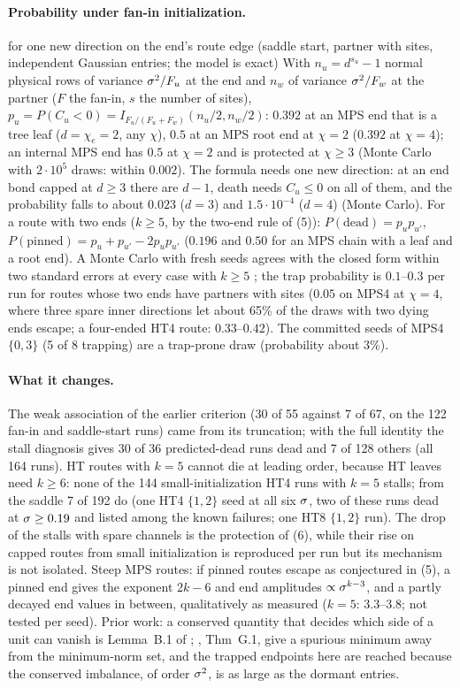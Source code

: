 \paragraph{Probability under fan-in initialization.}
\proven{} for one new direction on the end's route edge (saddle start, partner with sites, independent Gaussian
entries; the model is exact) With $n_u=d^{s_u}-1$ normal physical rows of variance $\sigma^2/F_u$ at the end and $n_w$ of
variance $\sigma^2/F_w$ at the partner ($F$ the fan-in, $s$ the number of sites), $p_u=P(C_u<0)=I_{F_u/(F_u+F_w)}(n_u/2,n_w/2)$:
$0.392$ at an MPS end that is a tree leaf ($d=\chi_e=2$, any $\chi$), $0.5$ at an MPS root end at $\chi=2$ ($0.392$ at
$\chi=4$); an internal MPS end has $0.5$ at $\chi=2$ and is protected at $\chi\ge3$ (Monte Carlo with $2\cdot10^5$ draws:
within $0.002$). The formula needs one new direction: at an end bond capped at $d\ge3$ there are $d-1$, death needs
$C_u\le0$ on all of them, and the probability falls to about $0.023$ ($d=3$) and $1.5\cdot10^{-4}$ ($d=4$) (Monte
Carlo). For a route with two ends ($k\ge5$, by the two-end rule of (5)): $P(\text{dead})=p_up_{u'}$, $P(\text{pinned})=p_u+p_{u'}-2p_up_{u'}$ ($0.196$ and $0.50$ for an
MPS chain with a leaf and a root end). A Monte Carlo with fresh seeds agrees with the closed form within two standard
errors at every case with $k\ge5$ \empirical; the trap probability is $0.1$--$0.3$ per run for routes whose two ends
have partners with sites ($0.05$ on MPS4 at $\chi=4$, where three spare inner directions let about 65\% of the draws
with two dying ends escape; a four-ended HT4 route: $0.33$--$0.42$). The committed seeds of MPS4 $\{0,3\}$ (5 of 8
trapping) are a trap-prone draw (probability about $3\%$).

\paragraph{What it changes.}
The weak association of the earlier criterion (30 of 55 against 7 of 67, on the 122 fan-in and saddle-start runs)
came from its truncation; with the full identity the stall diagnosis gives 30 of 36 predicted-dead runs dead and 7 of
128 others (all 164 runs). HT routes with $k=5$ cannot die at leading order, because HT leaves need $k\ge6$: none of
the 144 small-initialization HT4 runs with $k=5$ stalls; from the saddle 7 of 192 do (one HT4 $\{1,2\}$ seed at all six
$\sigma$, two of these runs dead at $\sigma\ge0.19$ and listed among the known failures; one HT8 $\{1,2\}$ run). The drop of the stalls with spare channels is the protection of (6),
while their rise on capped routes from small initialization is reproduced per run but its mechanism is not isolated.
Steep MPS routes: if pinned routes escape as conjectured in (5), a pinned end gives the exponent $2k-6$ and end
amplitudes $\propto\sigma^{k-3}$, and a partly decayed end values in between, qualitatively as measured ($k=5$: $3.3$--$3.8$;
not tested per seed). Prior work: a conserved quantity that decides which side of a unit can vanish is Lemma~B.1 of
\citet{kunin2025alternating}; \citet{furman2026benign}, Thm~G.1, give a spurious minimum away from the minimum-norm
set, and the trapped endpoints here are reached because the conserved imbalance, of order $\sigma^2$, is as large as the
dormant entries.

